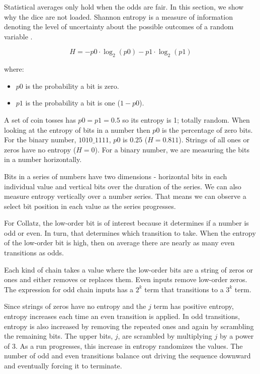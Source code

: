 \documentclass[letterpaper]{article}
\begin{document}
\begin{multicols}{2}
Statistical averages only hold when the odds are fair. In this section, we show why the dice are not loaded. Shannon entropy is a measure of information denoting the level of uncertainty about the possible outcomes of a random variable \cite{1}.

\[
H = -p0 \cdot \log_2(p0) - p1 \cdot \log_2(p1)
\]

where:
\begin{itemize}
    \item $p0$ is the probability a bit is zero.
    \item $p1$ is the probability a bit is one ($1 - p0$).
\end{itemize}

A set of coin tosses has $p0 = p1 = 0.5$ so its entropy is 1; totally random. When looking at the entropy of bits in a number then $p0$ is the percentage of zero bits. For the binary number, $1010\_1111$, $p0$ is $0.25$ ($H = 0.811$). Strings of all ones or zeros have no entropy ($H = 0$). For a binary number, we are measuring the bits in a number horizontally.

Bits in a series of numbers have two dimensions - horizontal bits in each individual value and vertical bits over the duration of the series. We can also measure entropy vertically over a number series. That means we can observe a select bit position in each value as the series progresses.

For Collatz, the low-order bit is of interest because it determines if a number is odd or even. In turn, that determines which transition to take. When the entropy of the low-order bit is high, then on average there are nearly as many even transitions as odds.

Each kind of chain takes a value where the low-order bits are a string of zeros or ones and either removes or replaces them. Even inputs remove low-order zeros. The expression for odd chain inputs has a $2^k$ term that transitions to a $3^k$ term.

Since strings of zeros have no entropy and the $j$ term has positive entropy, entropy increases each time an even transition is applied. In odd transitions, entropy is also increased by removing the repeated ones and again by scrambling the remaining bits. The upper bits, $j$, are scrambled by multiplying $j$ by a power of 3. As a run progresses, this increase in entropy randomizes the values. The number of odd and even transitions balance out driving the sequence downward and eventually forcing it to terminate.


\end{multicols}
\end{document}
